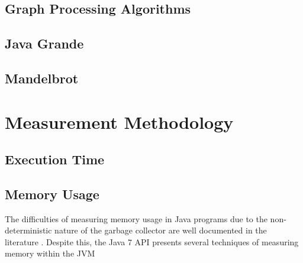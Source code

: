 	\subsection{Graph Processing Algorithms} \label{sec:methodology/benchmarks/graphs}
	
	\subsection{Java Grande} \label{sec:methodology/benchmarks/grande}
	
	\subsection{Mandelbrot} \label{sec:methodology/benchmarks/mandelbrot}
	
\section{Measurement Methodology} \label{sec:methodology/measurements}
	\subsection{Execution Time} \label{sec:methodology/measurements/time}
	
	\subsection{Memory Usage} \label{sec:methodology/measurements/memory}
	The difficulties of measuring memory usage in Java programs due to the non-deterministic nature of the garbage collector are well documented in the literature \citep{Kim2000,Ogata2010}. Despite this, the Java 7 API presents several techniques \citep{RuntimeDocs} of measuring memory within the JVM